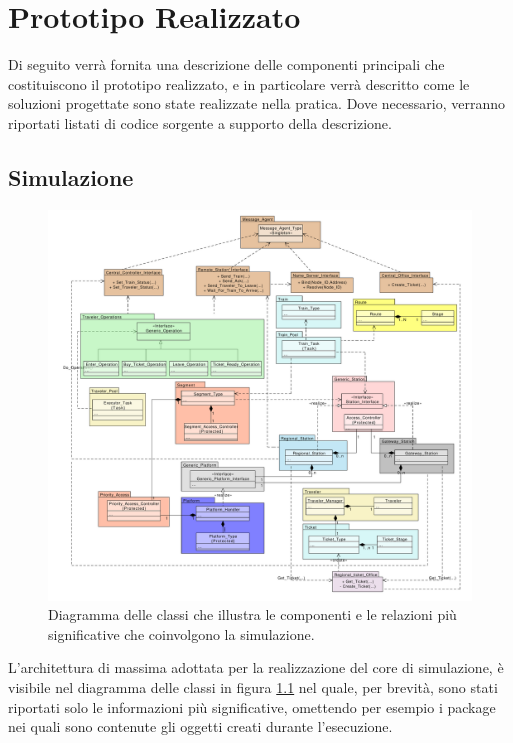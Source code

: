 \newpage
\chapter {Prototipo Realizzato}

Di seguito verrà fornita una descrizione delle componenti principali che costituiscono il prototipo realizzato, e in particolare verrà descritto come le soluzioni progettate sono state realizzate nella pratica. Dove necessario, verranno riportati listati di codice sorgente a supporto della descrizione.

\section{Simulazione}

	\begin{figure}[htbp]
		\includegraphics[scale=0.42,trim= 90mm 0mm 0mm 0mm]{imgs/Simplified_Class_Diagram.pdf}
		\caption{\footnotesize{Diagramma delle classi che illustra le componenti e le relazioni più significative che coinvolgono la simulazione.}}
		\label{img:class_diagram}
	\end{figure}

L'architettura di massima adottata per la realizzazione del core di simulazione, è visibile nel diagramma delle classi in figura \ref{img:class_diagram} nel quale, per brevità, sono stati riportati solo le informazioni più significative, omettendo per esempio i package nei quali sono contenute gli oggetti creati durante l'esecuzione.
	

